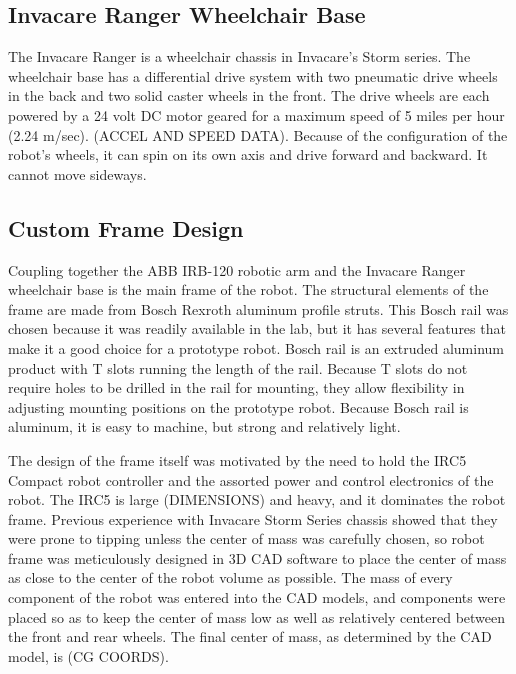 \documentclass{article}
\begin{document}
\subsection[Invacare Ranger Wheelchair Base]{Invacare Ranger Wheelchair Base}
The Invacare Ranger is a wheelchair chassis in Invacare{\textquoteright}s Storm series. The wheelchair base has a differential drive system with two pneumatic drive wheels in the back and two solid caster wheels in the front. The drive wheels are each powered by a 24 volt DC motor geared for a maximum speed of 5 miles per hour (2.24 m/sec). (ACCEL AND SPEED DATA). Because of the configuration of the robot{\textquoteright}s wheels, it can spin on its own axis and drive forward and backward. It cannot move sideways.

\subsection[Custom Frame Design]{Custom Frame Design}
Coupling together the ABB IRB-120 robotic arm and the Invacare Ranger wheelchair base is the main frame of the robot. The structural elements of the frame are made from Bosch Rexroth aluminum profile struts. This Bosch rail was chosen because it was readily available in the lab, but it has several features that make it a good choice for a prototype robot. Bosch rail is an extruded aluminum product with T slots running the length of the rail. Because T slots do not require holes to be drilled in the rail for mounting, they allow flexibility in adjusting mounting positions on the prototype robot. Because Bosch rail is aluminum, it is easy to machine, but strong and relatively light.

The design of the frame itself was motivated by the need to hold the IRC5 Compact robot controller and the assorted power and control electronics of the robot. The IRC5 is large (DIMENSIONS) and heavy, and it dominates the robot frame. Previous experience with Invacare Storm Series chassis showed that they were prone to tipping unless the center of mass was carefully chosen, so robot frame was meticulously designed in 3D CAD software to place the center of mass as close to the center of the robot volume as possible. The mass of every component of the robot was entered into the CAD models, and components were placed so as to keep the center of mass low as well as relatively centered between the front and rear wheels. The final center of mass, as determined by the CAD model, is (CG COORDS).
\end{document}
